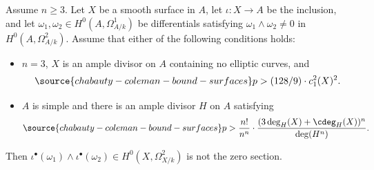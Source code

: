 \begin{lemma}
\notready\label{Lemma2forms} Assume $n\ge 3$. Let $X$ be a smooth surface in $A$, let $\iota:X\to A$ be the inclusion, and let $\omega_1,\omega_2\in H^0(A,\Omega^1_{A/k})$ be differentials satisfying  $\omega_1\wedge\omega_2\ne 0$ in $H^0(A,\Omega^2_{A/k})$. Assume that either of the following conditions holds:
\begin{itemize}
\item[(i)] $n=3$, $X$ is an ample divisor on $A$ containing no elliptic curves,  and
\begin{equation}\label{Eqn2formi}
\source{chabauty-coleman-bound-surfaces}
p>(128/9)\cdot c_1^2(X)^2.
\end{equation}
\item[(ii)] $A$ is simple and there is an ample divisor $H$ on $A$ satisfying
\begin{equation}\label{Eqn2formii}
\source{chabauty-coleman-bound-surfaces}
p>\frac{ n!}{n^n}\cdot \frac{(3\deg_H(X)+\cdeg_H(X))^n}{\deg(H^n)}.
\end{equation}
\end{itemize}
Then $\iota^\bullet (\omega_1)\wedge \iota^\bullet(\omega_2)\in H^0(X,\Omega^2_{X/k})$ is not the zero section.
\end{lemma}

